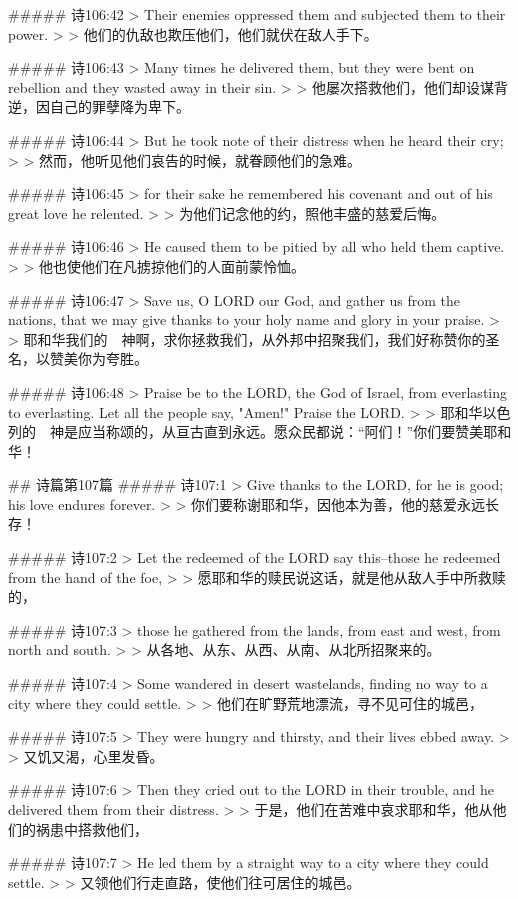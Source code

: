 ##### 诗106:42
> Their enemies oppressed them and subjected them to their power.
>
> 他们的仇敌也欺压他们，他们就伏在敌人手下。


##### 诗106:43
> Many times he delivered them, but they were bent on rebellion and they wasted away in their sin.
>
> 他屡次搭救他们，他们却设谋背逆，因自己的罪孽降为卑下。


##### 诗106:44
> But he took note of their distress when he heard their cry;
>
> 然而，他听见他们哀告的时候，就眷顾他们的急难。


##### 诗106:45
> for their sake he remembered his covenant and out of his great love he relented.
>
> 为他们记念他的约，照他丰盛的慈爱后悔。


##### 诗106:46
> He caused them to be pitied by all who held them captive.
>
> 他也使他们在凡掳掠他们的人面前蒙怜恤。


##### 诗106:47
> Save us, O LORD our God, and gather us from the nations, that we may give thanks to your holy name and glory in your praise.
>
> 耶和华我们的　神啊，求你拯救我们，从外邦中招聚我们，我们好称赞你的圣名，以赞美你为夸胜。


##### 诗106:48
> Praise be to the LORD, the God of Israel, from everlasting to everlasting. Let all the people say, "Amen!" Praise the LORD.
>
> 耶和华以色列的　神是应当称颂的，从亘古直到永远。愿众民都说：“阿们！”你们要赞美耶和华！


## 诗篇第107篇
##### 诗107:1
> Give thanks to the LORD, for he is good; his love endures forever.
>
> 你们要称谢耶和华，因他本为善，他的慈爱永远长存！


##### 诗107:2
> Let the redeemed of the LORD say this--those he redeemed from the hand of the foe,
>
> 愿耶和华的赎民说这话，就是他从敌人手中所救赎的，


##### 诗107:3
> those he gathered from the lands, from east and west, from north and south.
>
> 从各地、从东、从西、从南、从北所招聚来的。


##### 诗107:4
> Some wandered in desert wastelands, finding no way to a city where they could settle.
>
> 他们在旷野荒地漂流，寻不见可住的城邑，


##### 诗107:5
> They were hungry and thirsty, and their lives ebbed away.
>
> 又饥又渴，心里发昏。


##### 诗107:6
> Then they cried out to the LORD in their trouble, and he delivered them from their distress.
>
> 于是，他们在苦难中哀求耶和华，他从他们的祸患中搭救他们，


##### 诗107:7
> He led them by a straight way to a city where they could settle.
>
> 又领他们行走直路，使他们往可居住的城邑。


